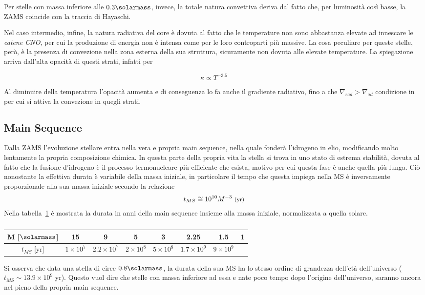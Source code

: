 Per stelle con massa inferiore alle $0.3 \si{\solarmass}$, invece, la totale natura convettiva deriva dal fatto che, per luminosità così basse, la ZAMS coincide con la traccia di Hayaschi.

Nel caso intermedio, infine, la natura radiativa del core è dovuta al fatto che le temperature non sono abbastanza elevate ad innescare le \textit{catene CNO}, per cui la produzione di energia non è intensa come per le loro controparti più massive. La cosa peculiare per queste stelle, però, è la presenza di convezione nella zona esterna della sua struttura, sicuramente non dovuta alle elevate temperature. La spiegazione arriva dall'alta opacità di questi strati, infatti per

\[
    \kappa \propto T^{-3.5}
\]

Al diminuire della temperatura l'opacità aumenta e di conseguenza lo fa anche il gradiente radiativo, fino a che $\nabla_{rad} > \nabla_{ad}$ condizione in per cui si attiva la convezione in quegli strati.

\subsection{Main Sequence}\label{sec:main-sequence-sub}

Dalla ZAMS l'evoluzione stellare entra nella vera e propria main sequence, nella quale fonderà l'idrogeno in elio, modificando molto lentamente la propria composizione chimica. In questa parte della propria vita la stella si trova in uno stato di estrema stabilità, dovuta al fatto che la fusione d'idrogeno è il processo termonucleare più efficiente che esista, motivo per cui questa fase è anche quella più lunga. Ciò nonostante la effettiva durata è variabile della massa iniziale, in particolare il tempo che questa impiega nella MS è inversamente proporzionale alla sua massa iniziale secondo la relazione 
\[
    t_{MS} \cong 10^{10}M^{-3}\mbox{ \footnotesize{(yr)}}
\]
Nella tabella~\ref{tab:MS} è mostrata la durata in anni della main sequence insieme alla massa iniziale, normalizzata a quella solare.
\begin{table}
    \centering
    \begin{tabular}{c | c c c c c c c}
        M [$\si{\solarmass}$] & 15 & 9 & 5 & 3 & 2.25 & 1.5 & 1\\
        \hline
        $t_{MS}$ [yr] & $1 \times 10^7$ & $ 2.2 \times 10^7$ & $2\times 10^8$ & $5\times 10^8$ & $1.7 \times 10^9$ & $9\times 10^9$\\
    \end{tabular}
    \caption{}\label{tab:MS}
\end{table}

Si osserva che data una stella di circe $0.8 \si{\solarmass}$, la durata della sua MS ha lo stesso ordine di grandezza dell'età dell'universo ($t_{MS} \sim 13.9\times 10^9 \mbox{ yr}$). Questo vuol dire che stelle con massa inferiore ad essa e nate poco tempo dopo l'origine dell'universo, saranno ancora nel pieno della propria main sequence.